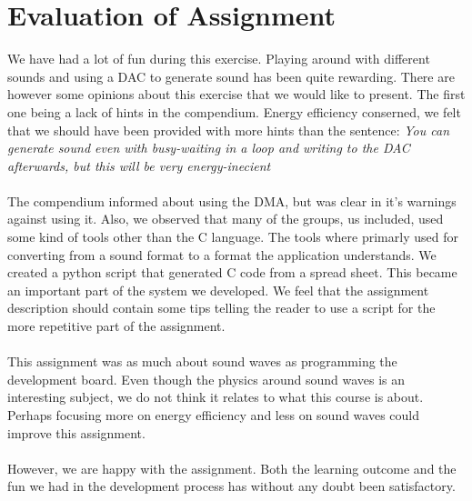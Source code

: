 \section{Evaluation of Assignment}
We have had a lot of fun during this exercise. Playing around with different sounds and using a DAC to generate sound has been quite rewarding. There are however some opinions about this exercise that we would like to present. The first one being a lack of hints in the compendium. Energy efficiency conserned, we felt that we should have been provided with more hints than the sentence: \emph{You can generate sound even with busy-waiting in a loop and writing to the DAC afterwards, but this will be very energy-inecient}\\
\\
The compendium informed about using the DMA, but was clear in it's warnings against using it. Also, we observed that many of the groups, us included, used some kind of tools other than the C language. The tools where primarly used for converting from a sound format to a format the application understands. We created a python script that generated C code from a spread sheet. This became an important part of the system we developed. We feel that the assignment description should contain some tips telling the reader to use a script for the more repetitive part of the assignment.\\
\\
This assignment was as much about sound waves as programming the development board. Even though the physics around sound waves is an interesting subject, we do not think it relates to what this course is about. Perhaps focusing more on energy efficiency and less on sound waves could improve this assignment. \\
\\
However, we are happy with the assignment. Both the learning outcome and the fun we had in the development process has without any doubt been satisfactory.
